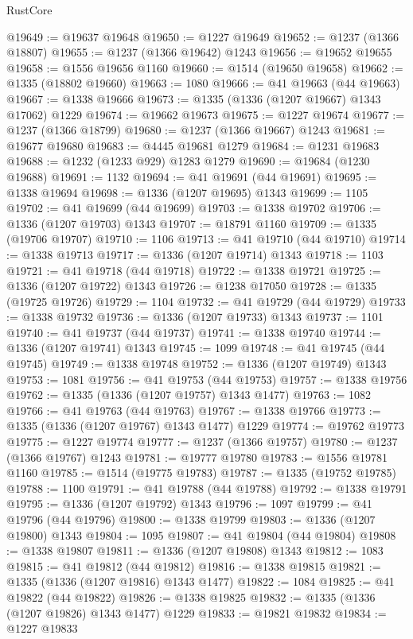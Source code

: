 \begin{lexlean}{RustCore}
\begin{coremodule}
@19649 := @19637 @19648
@19650 := @1227 @19649
@19652 := @1237 (@1366 @18807)
@19655 := @1237 (@1366 @19642) @1243
@19656 := @19652 @19655
@19658 := @1556 @19656 @1160
@19660 := @1514 (@19650 @19658)
@19662 := @1335 (@18802 @19660)
@19663 := 1080
@19666 := @41 @19663 (@44 @19663)
@19667 := @1338 @19666
@19673 := @1335 (@1336 (@1207 @19667) @1343 @17062) @1229
@19674 := @19662 @19673
@19675 := @1227 @19674
@19677 := @1237 (@1366 @18799)
@19680 := @1237 (@1366 @19667) @1243
@19681 := @19677 @19680
@19683 := @4445 @19681 @1279
@19684 := @1231 @19683
@19688 := @1232 (@1233 @929) @1283 @1279
@19690 := @19684 (@1230 @19688)
@19691 := 1132
@19694 := @41 @19691 (@44 @19691)
@19695 := @1338 @19694
@19698 := @1336 (@1207 @19695) @1343
@19699 := 1105
@19702 := @41 @19699 (@44 @19699)
@19703 := @1338 @19702
@19706 := @1336 (@1207 @19703) @1343
@19707 := @18791 @1160
@19709 := @1335 (@19706 @19707)
@19710 := 1106
@19713 := @41 @19710 (@44 @19710)
@19714 := @1338 @19713
@19717 := @1336 (@1207 @19714) @1343
@19718 := 1103
@19721 := @41 @19718 (@44 @19718)
@19722 := @1338 @19721
@19725 := @1336 (@1207 @19722) @1343
@19726 := @1238 @17050
@19728 := @1335 (@19725 @19726)
@19729 := 1104
@19732 := @41 @19729 (@44 @19729)
@19733 := @1338 @19732
@19736 := @1336 (@1207 @19733) @1343
@19737 := 1101
@19740 := @41 @19737 (@44 @19737)
@19741 := @1338 @19740
@19744 := @1336 (@1207 @19741) @1343
@19745 := 1099
@19748 := @41 @19745 (@44 @19745)
@19749 := @1338 @19748
@19752 := @1336 (@1207 @19749) @1343
@19753 := 1081
@19756 := @41 @19753 (@44 @19753)
@19757 := @1338 @19756
@19762 := @1335 (@1336 (@1207 @19757) @1343 @1477)
@19763 := 1082
@19766 := @41 @19763 (@44 @19763)
@19767 := @1338 @19766
@19773 := @1335 (@1336 (@1207 @19767) @1343 @1477) @1229
@19774 := @19762 @19773
@19775 := @1227 @19774
@19777 := @1237 (@1366 @19757)
@19780 := @1237 (@1366 @19767) @1243
@19781 := @19777 @19780
@19783 := @1556 @19781 @1160
@19785 := @1514 (@19775 @19783)
@19787 := @1335 (@19752 @19785)
@19788 := 1100
@19791 := @41 @19788 (@44 @19788)
@19792 := @1338 @19791
@19795 := @1336 (@1207 @19792) @1343
@19796 := 1097
@19799 := @41 @19796 (@44 @19796)
@19800 := @1338 @19799
@19803 := @1336 (@1207 @19800) @1343
@19804 := 1095
@19807 := @41 @19804 (@44 @19804)
@19808 := @1338 @19807
@19811 := @1336 (@1207 @19808) @1343
@19812 := 1083
@19815 := @41 @19812 (@44 @19812)
@19816 := @1338 @19815
@19821 := @1335 (@1336 (@1207 @19816) @1343 @1477)
@19822 := 1084
@19825 := @41 @19822 (@44 @19822)
@19826 := @1338 @19825
@19832 := @1335 (@1336 (@1207 @19826) @1343 @1477) @1229
@19833 := @19821 @19832
@19834 := @1227 @19833

\end{coremodule}
\end{lexlean}
